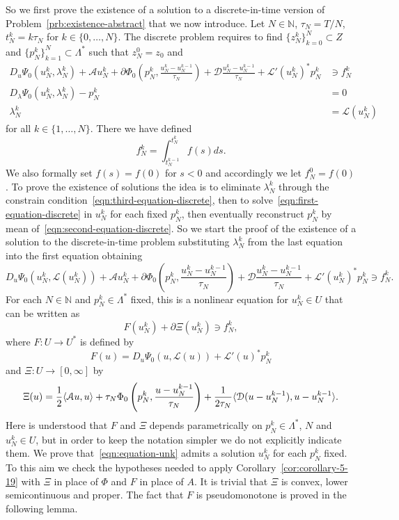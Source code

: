 \documentclass[a4paper,10pt,oneside]{amsbook}
\numberwithin{section}{chapter}
\numberwithin{equation}{chapter}
\theoremstyle{definition}
\DeclarePairedDelimiter{\dual}{\langle}{\rangle}
\begin{document}
So we first prove the existence of a solution to a discrete-in-time version of Problem~\ref{prb:existence-abstract} that we now introduce. Let $N\in\mathbb{N}$, $\tau_N=T/N$, $t_N^k=k\tau_N$ for $k\in\{0,\dots, N\}$. The discrete problem requires to find $\{z_N^k\}_{k=0}^N\subset Z$ and $\{p_N^k\}_{k=1}^N\subset\Lambda^*$ such that $z_N^0=z_0$ and
\begin{align}
\label{eqn:first-equation-discrete}
D_u\Psi_0(u_N^k,\lambda_N^k)+\mathcal{A}u_N^k+\partial\Phi_0\left(p_N^k,\frac{u_N^k-u_N^{k-1}}{\tau_N}\right)+\mathcal{D}\frac{u_N^k-u_N^{k-1}}{\tau_N}+\mathcal{L}'(u_N^k)^*p_N^k&\ni f_N^k \\
\label{eqn:second-equation-discrete}
D_\lambda\Psi_0(u_N^k,\lambda_N^k)-p_N^k&=0 \\
\label{eqn:third-equation-discrete}
\lambda_N^k&=\mathcal{L}(u_N^k)
\end{align}
for all $k\in\{1,\dots,N\}$. There we have defined
\[
f_N^k=\int_{t_N^{k-1}}^{t_N^k}f(s)ds.
\]
We also formally set $f(s)=f(0)$ for $s<0$ and accordingly we let $f_N^0=f(0)$. To prove the existence of solutions the idea is to eliminate $\lambda_N^k$ through the constrain condition~\eqref{eqn:third-equation-discrete}, then to solve~\eqref{eqn:first-equation-discrete} in $u_N^k$ for each fixed $p_N^k$, then eventually reconstruct $p_N^k$ by mean of~\eqref{eqn:second-equation-discrete}. So we start the proof of the existence of a solution to the discrete-in-time problem substituting $\lambda_N^k$ from the last equation into the first equation obtaining
\[
D_u\Psi_0(u_N^k,\mathcal{L}(u_N^k))+\mathcal{A}u_N^k+\partial\Phi_0\left(p_N^k,\frac{u_N^k-u_N^{k-1}}{\tau_N}\right)+\mathcal{D}\frac{u_N^k-u_N^{k-1}}{\tau_N}+\mathcal{L}'(u_N^k)^*p_N^k\ni f_N^k.
\]
For each $N\in\mathbb{N}$ and $p_N^k\in\Lambda^*$ fixed, this is a nonlinear equation for $u_N^k\in U$ that can be written as
\begin{equation}
\label{eqn:equation-unk}
F(u_N^k)+\partial\Xi(u_N^k)\ni f_N^k,
\end{equation}
where $F\colon U\to U^*$ is defined by
\[
F(u)=D_u\Psi_0(u,\mathcal{L}(u))+\mathcal{L}'(u)^*p_N^k
\]
and $\Xi\colon U\to[0,\infty]$ by
\[
\Xi(u)=\frac{1}{2}\dual{\mathcal{A}u,u}+\tau_N\Phi_0\left(p_N^k,\frac{u-u_N^{k-1}}{\tau_N}\right)+\frac{1}{2\tau_N}\dual{\mathcal{D}(u-u_N^{k-1}),u-u_N^{k-1}}.
\]
Here is understood that $F$ and $\Xi$ depends parametrically on $p_N^k\in\Lambda^*$, $N$ and $u_N^k\in U$, but in order to keep the notation simpler we do not explicitly indicate them. We prove that~\eqref{eqn:equation-unk} admits a solution $u_N^k$ for each $p_N^k$ fixed. To this aim we check the hypotheses needed to apply Corollary~\ref{cor:corollary-5-19} with $\Xi$ in place of $\Phi$ and $F$ in place of $A$. It is trivial that $\Xi$ is convex, lower semicontinuous and proper. The fact that $F$ is pseudomonotone is proved in the following lemma.
\end{document}
